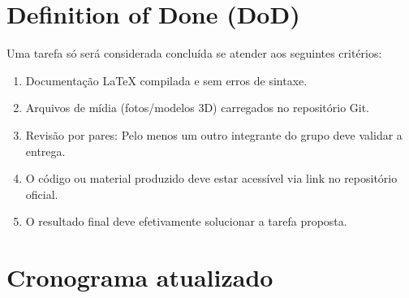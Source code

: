 \documentclass[12pt, a4paper]{article}
\begin{document}
\section{Definition of Done (DoD)}
Uma tarefa só será considerada concluída se atender aos seguintes critérios:
\begin{enumerate}
    \item Documentação LaTeX compilada e sem erros de sintaxe.
    \item Arquivos de mídia (fotos/modelos 3D) carregados no repositório Git.
    \item Revisão por pares: Pelo menos um outro integrante do grupo deve validar a entrega.
    \item O código ou material produzido deve estar acessível via link no repositório oficial.
    \item O resultado final deve efetivamente solucionar a tarefa proposta.
\end{enumerate}

\section{Cronograma atualizado}
\end{document}
